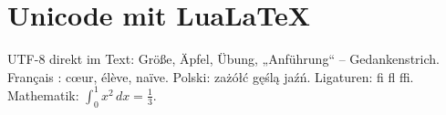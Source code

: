 \documentclass{article}
\begin{document}
\section{Unicode mit Lua\LaTeX}
UTF-8 direkt im Text: Größe, Äpfel, Übung, „Anführung“ – Gedankenstrich.
Français : cœur, élève, naïve. Polski: zażółć gęślą jaźń.
Ligaturen: fi fl ffi. Mathematik: $\int_0^1 x^2\,dx = \frac13$.
\end{document}

